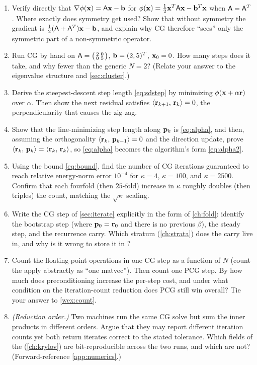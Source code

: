 \exercisessection
\begin{enumerate}[nosep]
  \item Verify directly that $\nabla\phi(\mathbf{x})=\mathsf{A}\mathbf{x}-\mathbf{b}$ for
  $\phi(\mathbf{x})=\tfrac12\mathbf{x}^{T}\mathsf{A}\mathbf{x}-\mathbf{b}^{T}\mathbf{x}$ when $\mathsf{A}=\mathsf{A}^{T}$.
  Where exactly does symmetry get used? Show that without symmetry the gradient is
  $\tfrac12(\mathsf{A}+\mathsf{A}^{T})\mathbf{x}-\mathbf{b}$, and explain why CG therefore ``sees'' only
  the symmetric part of a non-symmetric operator.
  \item Run CG by hand on
  $\mathsf{A}=\bigl(\begin{smallmatrix}2&0\\0&5\end{smallmatrix}\bigr)$,
  $\mathbf{b}=(2,5)^{T}$, $\mathbf{x}_0=0$. How many steps does it take, and why fewer than the
  generic $N=2$? (Relate your answer to the eigenvalue structure and
  \cref{sec:cluster}.)
  \item Derive the steepest-descent step length \eqref{eq:sdstep} by minimizing
  $\phi(\mathbf{x}+\alpha\mathbf{r})$ over $\alpha$. Then show the next residual satisfies
  $\left\langle \mathbf{r}_{k+1},\, \mathbf{r}_k\right\rangle=0$, the perpendicularity that causes the zig-zag.
  \item Show that the line-minimizing step length along $\mathbf{p}_k$ is
  \eqref{eq:alpha}, and then, assuming the orthogonality
  $\left\langle \mathbf{r}_k,\, \mathbf{p}_{k-1}\right\rangle=0$ and the direction update, prove
  $\left\langle \mathbf{r}_k,\, \mathbf{p}_k\right\rangle=\left\langle \mathbf{r}_k,\, \mathbf{r}_k\right\rangle$, so \eqref{eq:alpha} becomes the
  algorithm's form \eqref{eq:alpha2}.
  \item Using the bound \eqref{eq:bound}, find the number of CG iterations
  guaranteed to reach relative energy-norm error $10^{-4}$ for $\kappa=4$,
  $\kappa=100$, and $\kappa=2500$. Confirm that each fourfold (then $25$-fold)
  increase in $\kappa$ roughly doubles (then triples) the count, matching the
  $\sqrt\kappa$ scaling.
  \item Write the CG step of \cref{sec:iterate} explicitly in the
   form of \cref{ch:fold}: identify the bootstrap
  step (where $\mathbf{p}_0=\mathbf{r}_0$ and there is no previous $\beta$), the steady step, and
  the recurrence carry. Which stratum (\cref{ch:strata}) does the carry live in,
  and why is it wrong to store it in ?
  \item Count the floating-point operations in one CG step as a function of $N$
  (count the apply abstractly as ``one matvec''). Then count one PCG step. By how
  much does preconditioning increase the per-step cost, and under what condition on
  the iteration-count reduction does PCG still win overall? Tie your answer to
  \cref{wex:count}.
  \item \emph{(Reduction order.)} Two machines run the same CG solve but sum the
  inner products in different orders. Argue that they may report different
  iteration counts yet both return iterates correct to the stated tolerance.
  Which fields of the  (\cref{ch:krylov}) are bit-reproducible
  across the two runs, and which are not? (Forward-reference
  \cref{app:numerics}.)
\end{enumerate}
